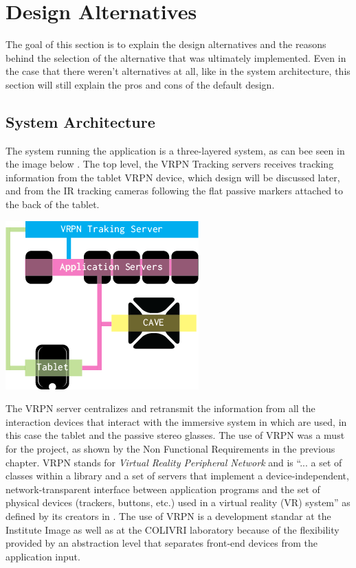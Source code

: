 \section{Design Alternatives}
The goal of this section is to explain the design alternatives and the reasons behind the selection of the alternative that was ultimately implemented. Even in the case that there weren't alternatives at all, like in the system architecture, this section will still explain the pros and cons of the default design.
\subsection{System Architecture}
The system running the application is a three-layered system, as can bee seen in the image below . The top level, the VRPN Tracking servers receives tracking information from the tablet VRPN device, which design will be discussed later, and from the IR tracking cameras following the flat passive markers attached to the back of the tablet.

\begin{center}
\includegraphics[scale=0.75]{Images/architecture.png}
\label{fig:architecture}
\end{center}

The VRPN server centralizes and retransmit the information from all the interaction devices that interact with the immersive system in which are used, in this case the tablet and the passive stereo glasses. The use of VRPN was a must for the project, as shown by the Non Functional Requirements in the previous chapter. VRPN stands for \emph{Virtual Reality Peripheral Network} and is ``... a set of classes within a library and a set of servers that implement a device-independent, network-transparent interface between application programs and the set of physical devices (trackers, buttons, etc.) used in a virtual reality (VR) system'' as defined by its creators in \cite{vrpn}. The use of VRPN is a development standar at the Institute Image as well as at the COLIVRI laboratory because of the flexibility provided by an abstraction level that separates front-end devices from the application input.

